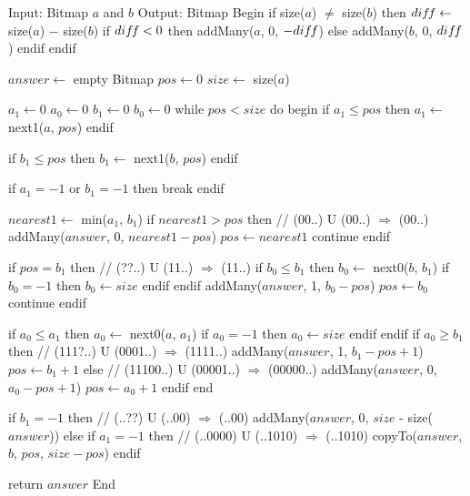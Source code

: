 \begin{algo}[caption=\textbf{U}ntil, label={alg:until}]
Input: Bitmap $a$ and $b$
Output: Bitmap
Begin
  if size($a$) $\neq$ size($b$) then
    $dif\hspace{-0.1em}f \gets$ size($a$) $-$ size($b$)
    if $dif\hspace{-0.1em}f < 0$ then
      addMany($a$, 0, $-dif\hspace{-0.1em}f$)
    else
      addMany($b$, 0, $dif\hspace{-0.1em}f$)
    endif
  endif

  $answer \gets$ empty Bitmap
  $pos \gets 0$
  $size \gets$ size($a$)

  $a_1 \gets 0$
  $a_0 \gets 0$
  $b_1 \gets 0$
  $b_0 \gets 0$
  while $pos < size$ do
  begin
    if $a_1 \leq pos$ then
      $a_1 \gets$ next1($a$, $pos$)
    endif

    if $b_1 \leq pos$ then
      $b_1 \gets$ next1($b$, $pos$)
    endif

    if $a_1 = -1$ or $b_1 = -1$ then
      break
    endif

    $nearest1 \gets$ min($a_1$, $b_1$)
    if $nearest1 > pos$ then
      // (00..) U (00..) $\Rightarrow$ (00..)
      addMany($answer$, 0, $nearest1 - pos$)
      $pos \gets nearest1$
      continue
    endif

    if $pos = b_1$ then
      // (??..) U (11..) $\Rightarrow$ (11..)
      if $b_0 \leq b_1$ then
        $b_0 \gets$ next0($b$, $b_1$)
        if $b_0 = -1$ then
          $b_0 \gets size$
        endif
      endif
      addMany($answer$, 1, $b_0 - pos$)
      $pos \gets b_0$
      continue
    endif

    if $a_0 \leq a_1$ then
      $a_0 \gets$ next0($a$, $a_1$)
      if $a_0 = -1$ then
        $a_0 \gets size$
      endif
    endif
    if $a_0 \geq b_1$ then
      // (111?..) U (0001..) $\Rightarrow$ (1111..)
      addMany($answer$, 1, $b_1 - pos + 1$)
      $pos \gets b_1 + 1$
    else
      // (11100..) U (00001..) $\Rightarrow$ (00000..)
      addMany($answer$, 0, $a_0 - pos + 1$)
      $pos \gets a_0 + 1$
    endif
  end

  if $b_1 = -1$ then
    // (..??) U (..00) $\Rightarrow$ (..00)
    addMany($answer$, 0, $size$ - size($answer$))
  else if $a_1 = -1$ then
    // (..0000) U (..1010) $\Rightarrow$ (..1010)
    copyTo($answer$, $b$, $pos$, $size - pos$)
  endif

  return $answer$
End
\end{algo}

